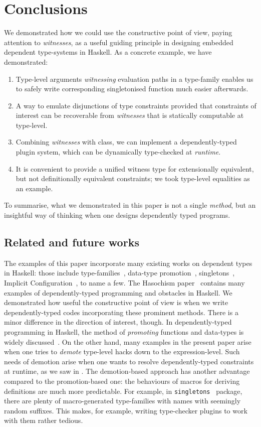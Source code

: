 \documentclass[demotion-paper.tex]{subfiles}
\begin{document}
\section{Conclusions}
\label{sec:concl}
We demonstrated how we could use the constructive point of view, paying attention to \emph{witnesses}, as a useful guiding principle in designing embedded dependent type-systems in Haskell.
As a concrete example, we have demonstrated:
\begin{enumerate}
  \item Type-level arguments \emph{witnessing} evaluation paths in a type-family enables us to safely write corresponding singletonised function much easier afterwards.
  \item A way to emulate disjunctions of type constraints provided that constraints of interest can be recoverable from \emph{witnesses} that is statically computable at type-level.
  \item Combining \emph{witnesses} with  class, we can implement a dependently-typed plugin system, which can be dynamically type-checked at \emph{runtime}.
  \item It is convenient to provide a unified witness type for extensionally equivalent, but not definitionally equivalent constraints; we took type-level equalities as an example.
\end{enumerate}
To summarise, what we demonstrated in this paper is not a single \emph{method}, but an insightful way of thinking when one designs dependently typed programs.

\subsection{Related and future works}
The examples of this paper incorporate many existing works on dependent types in Haskell: those include type-families~\cite{Kiselyov:2010aa}, data-type promotion~\cite{Yorgey:2012}, singletons~\cite{Eisenberg:2012}, Implicit Configuration~\cite{Kiselyov:2004aa}, to name a few.
The Hasochism paper~\cite{10.1145/2503778.2503786} contains many examples of dependently-typed programming and obstacles in Haskell.
We demonstrated how useful the constructive point of view is when we write dependently-typed codes incorporating these prominent methods.
There is a minor difference in the direction of interest, though.
In dependently-typed programming in Haskell, the method of \emph{promoting} functions and data-types is widely discussed~\cite{Yorgey:2012,Eisenberg:2012,10.1145/2503778.2503786}.
On the other hand, many examples in the present paper arise when one tries to \emph{demote} type-level hacks down to the expression-level.
Such needs of demotion arise when one wants to resolve dependently-typed constraints at runtime, as we saw in .
The demotion-based approach has another advantage compared to the promotion-based one: the behaviours of macros for deriving definitions are much more predictable.
For example, in \texttt{singletons}~\cite{singletons} package, there are plenty of macro-generated type-families with names with seemingly random suffixes.
This makes, for example, writing type-checker plugins to work with them rather tedious.
\end{document}
